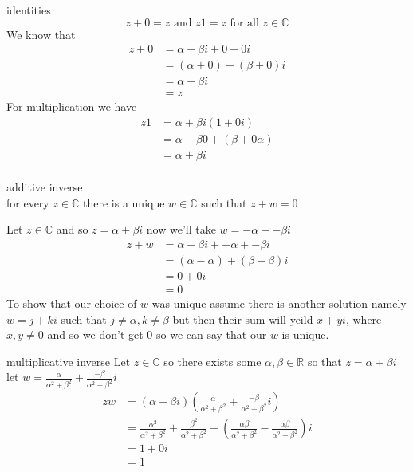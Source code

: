 \documentclass[11pt]{book}
\begin{document}
\begin{ver}
    identities
    \begin{equation*}
        z + 0 = z \text{ and } z1 = z \text{ for all } z \in \mathbb{C}
    \end{equation*}
    We know that 
    \begin{align*}
        z + 0 &= \alpha + \beta i + 0 + 0 i\\
              &= \left( \alpha + 0 \right) + \left( \beta + 0 \right) i \\
              &= \alpha + \beta i\\
              &= z  
    \end{align*}
    For multiplication we have
    \begin{align*}
        z1 &=\alpha + \beta i\left( 1 + 0i \right)\\
           &= \alpha - \beta 0 + \left( \beta + 0\alpha  \right)\\
           &= \alpha + \beta i\\
    \end{align*}
\end{ver}

\begin{ver}
    additive inverse\\
    for every $z \in \mathbb{C}$ there is a unique $w \in \mathbb{C}$ such that $z + w = 0$ 

    Let $z \in \mathbb{C}$ and so $z = \alpha + \beta i$ now we'll take $w = -\alpha  + -\beta  i$ 
    \begin{align*}
        z + w &= \alpha + \beta i + -\alpha  + -\beta  i\\
              &= \left( \alpha -\alpha  \right) + \left( \beta - \beta  \right)i\\
              &=0 + 0 i\\
              &=0
    \end{align*}
    To show that our choice of $w$ was unique assume there is another solution namely $w = j + k i$ such that $j \neq \alpha , k \neq \beta $ but then their sum will yeild $x + y i$,  where $x,y \neq 0$ and so we don't get $0$ so we can say that our $w$ is unique.
\end{ver}

\begin{ver}
    multiplicative inverse
    Let $z \in \mathbb{C}$ so there exists some $\alpha, \beta \in \mathbb{R}$ so that $z = \alpha + \beta i$   let $w = \frac{\alpha}{\alpha^2 + \beta^2} + \frac{-\beta}{\alpha^2 + \beta^2} i$ 
    \begin{align*}
        zw &= \left( \alpha + \beta i \right)\left( \frac{\alpha}{\alpha^2 + \beta^2} + \frac{-\beta}{\alpha^2 + \beta^2}i \right)\\
           &= \frac{\alpha^2}{\alpha^2 + \beta^2} + \frac{\beta^2}{\alpha^2 + \beta^2} + \left( \frac{\alpha \beta }{\alpha^2 + \beta^2} - \frac{\alpha \beta }{\alpha^2 + \beta^2} \right)i\\
           &= 1 + 0i\\
           &=1
    \end{align*}
\end{ver}
\end{document}
